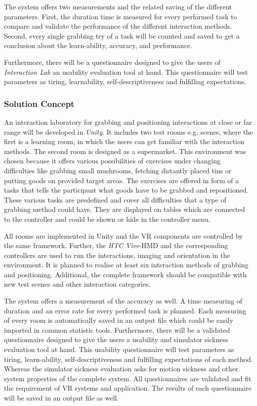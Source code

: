 The system offers two measurements and the related saving of the different parameters. First, the duration time is measured for every performed task to compare and validate the performance of the different interaction methods. Second, every single grabbing try of a task will be counted and saved to get a conclusion about the learn-ability, accuracy, and performance.

Furthermore, there will be a questionnaire designed to give the users of \textit{Interaction Lab} an usability evaluation tool at hand. This questionnaire will test parameters as tiring, learnability, self-descriptiveness and fulfilling expectations.


\subsubsection{Solution Concept}\label{sec:Projectconcept}
An interaction laboratory for grabbing and positioning interactions at close or far range will be developed in \textit{Unity}. It includes two test rooms e.g. scenes, where the first is a learning room, in which the users can get familiar with the interaction methods. The second room is designed as a supermarket. This environment was chosen because it offers various possibilities of exercises under changing difficulties like grabbing small mushrooms, fetching distantly placed tins or putting goods on provided target areas. The exercises are offered in form of a tasks that tells the participant what goods have to be grabbed and repositioned. These various tasks are predefined and cover all difficulties that a type of grabbing method could have. They are displayed on tables which are connected to the controller and could be shown or hide in the controller menu. 

All rooms are implemented in Unity and the VR components are controlled by the same framework. Further, the \textit{HTC Vive}-HMD and the corresponding controllers are used to run the interactions, imaging and orientation in the environment. It is planned to realise at least six interaction methods of grabbing and positioning. Additional, the complete framework should be compatible with new test scenes and other interaction categories. 

The system offers a measurement of the accuracy as well. A time measuring of duration and an error rate for every performed task is planned. Each measuring of every room is automatically saved in an output file which could be easily imported in common statistic tools. Furthermore, there will be a validated questionnaire designed to give the users a usability and simulator sickness evaluation tool at hand. This usability questionnaire will test parameters as tiring, learn-ability, self-descriptiveness and fulfilling expectations of each method. Whereas the simulator sickness evaluation asks for motion sickness and other system properties of the complete system. All questionnaires are validated and fit the requirement of VR systems and application. The results of each questionnaire will be saved in an output file as well.

